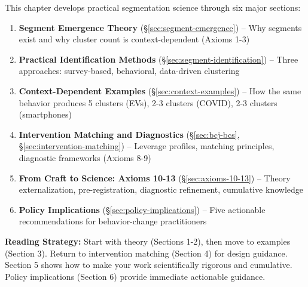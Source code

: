 
\begin{tcolorbox}[colback=green!5!white, colframe=green!75!black,
    title=Chapter Overview: Structure and Key Sections]

This chapter develops practical segmentation science through six major sections:

\begin{enumerate}

\item \textbf{Segment Emergence Theory} (\S\ref{sec:segment-emergence})
  -- Why segments exist and why cluster count is context-dependent (Axioms 1-3)

\item \textbf{Practical Identification Methods} (\S\ref{sec:segment-identification})
  -- Three approaches: survey-based, behavioral, data-driven clustering

\item \textbf{Context-Dependent Examples} (\S\ref{sec:context-examples})
  -- How the same behavior produces 5 clusters (EVs), 2-3 clusters (COVID),
  2-3 clusters (smartphones)

\item \textbf{Intervention Matching and Diagnostics} (\S\ref{sec:bcj-bcs}, \S\ref{sec:intervention-matching})
  -- Leverage profiles, matching principles, diagnostic frameworks (Axioms 8-9)

\item \textbf{From Craft to Science: Axioms 10-13} (\S\ref{sec:axioms-10-13})
  -- Theory externalization, pre-registration, diagnostic refinement, cumulative knowledge

\item \textbf{Policy Implications} (\S\ref{sec:policy-implications})
  -- Five actionable recommendations for behavior-change practitioners

\end{enumerate}

\textbf{Reading Strategy:}
Start with theory (Sections 1-2), then move to examples (Section 3). Return
to intervention matching (Section 4) for design guidance. Section 5 shows how
to make your work scientifically rigorous and cumulative. Policy implications
(Section 6) provide immediate actionable guidance.

\end{tcolorbox}

